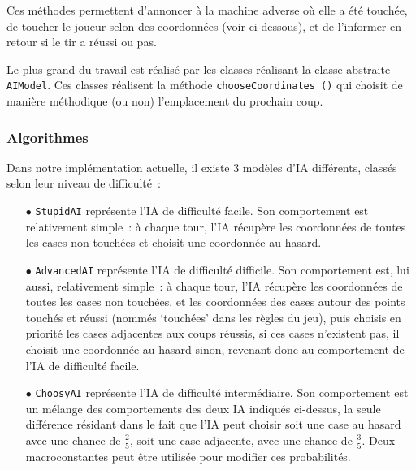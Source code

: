 \documentclass[12pt]{article}
\begin{document}
Ces méthodes permettent d'annoncer à la machine adverse où elle a été touchée,
de toucher le joueur selon des coordonnées (voir ci-dessous), et de l'informer
en retour si le tir a réussi ou pas.

Le plus grand du travail est réalisé par les classes réalisant la
classe abstraite \texttt{AIModel}. Ces classes réalisent la méthode
\texttt{chooseCoordinates ()} qui choisit de manière méthodique (ou non)
l'emplacement du prochain coup.
\bigskip

\subsubsection{Algorithmes}
Dans notre implémentation actuelle, il existe 3 modèles d'IA différents,
classés selon leur niveau de difficulté :

\bigskip

\begin{itemize}
      \item[$\bullet$] \texttt{StupidAI} représente l'IA de difficulté facile.
            Son
            comportement est relativement simple : à chaque tour, l'IA récupère
            les
            coordonnées de toutes les cases non touchées et choisit une
            coordonnée au
            hasard.

            \bigskip

      \item[$\bullet$] \texttt{AdvancedAI} représente l'IA de difficulté
            difficile. Son comportement est, lui aussi, relativement simple : à
            chaque
            tour, l'IA récupère les coordonnées de toutes les cases non
            touchées, et les
            coordonnées des cases autour des points touchés et réussi (nommés
            `touchées'
            dans les règles du jeu), puis choisis en priorité les cases
            adjacentes aux
            coups réussis, si ces cases n'existent pas, il choisit une
            coordonnée au hasard
            sinon, revenant donc au comportement de l'IA de difficulté facile.

            \bigskip

      \item[$\bullet$] \texttt{ChoosyAI} représente l'IA de difficulté
            intermédiaire. Son
            comportement est un mélange des comportements des deux IA indiqués
            ci-dessus,
            la seule différence résidant dans le fait que l'IA peut choisir
            soit une case
            au hasard avec une chance de $\frac{2}{5}$, soit une case
            adjacente, avec une
            chance de $\frac{3}{5}$. Deux macroconstantes peut être utilisée
            pour modifier
            ces probabilités.
\end{itemize}
\end{document}
